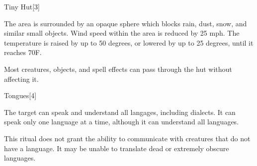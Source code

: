 \begin{spellsection}{Tiny Hut}[3]
    \begin{spellheader}
    \end{spellheader}
    \begin{spellcontent}
        \begin{spelltargetinginfo}
        \end{spelltargetinginfo}
        \begin{spelleffects}
            \spelleffect The area is surrounded by an opaque sphere which blocks rain, dust, snow, and similar small objects. Wind speed within the area is reduced by 25 mph. The temperature is raised by up to 50 degrees, or lowered by up to 25 degrees, until it reaches 70\degree F.
            \spelldur \durext \dismissable
        \end{spelleffects}
    \end{spellcontent}
    \begin{spellfooter}
        \spellnotes Most creatures, objects, and spell effects can pass through the hut without affecting it.
    \end{spellfooter}
    \begin{spellaugments}
    \end{spellaugments}
\end{spellsection}

\begin{spellsection}{Tongues}[4]
    \begin{spellheader}
    \end{spellheader}
    \begin{spellcontent}
        \begin{spelltargetinginfo}
        \end{spelltargetinginfo}
        \begin{spelleffects}
            \spelleffect The target can speak and understand all langages, including dialects. It can speak only one language at a time, although it can understand all languages.
            \spelldur \durlong
        \end{spelleffects}
    \end{spellcontent}
    \begin{spellfooter}
        \spellnotes This ritual does not grant the ability to communicate with creatures that do not have a language. It may be unable to translate dead or extremely obscure languages.
    \end{spellfooter}
\end{spellsection}

